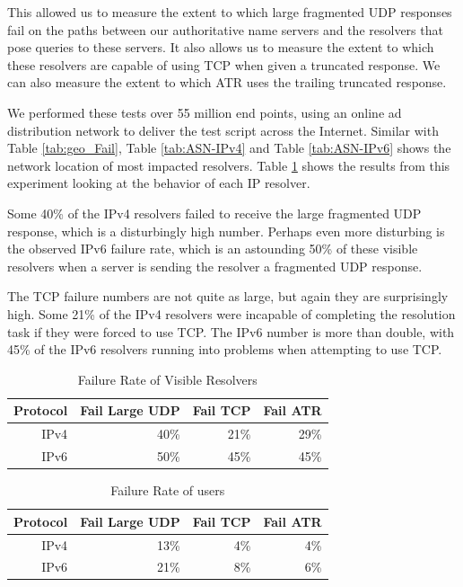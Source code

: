 This allowed us to measure the extent to which large 
fragmented UDP responses fail on the paths between our 
authoritative name servers and the resolvers that pose 
queries to these servers. It also allows us to measure 
the extent to which these resolvers are capable of using 
TCP when given a truncated response. We can also measure 
the extent to which ATR uses the trailing truncated response.

We performed these tests over 55 million end points, using 
an online ad distribution network to deliver the test script 
across the Internet. Similar with Table \ref{tab:geo_Fail}, 
Table \ref{tab:ASN-IPv4} and Table \ref{tab:ASN-IPv6} shows 
the network location of most impacted resolvers. Table 
\ref{tab:fail_resolver} shows the results from this experiment 
looking at the behavior of each IP resolver.

Some 40\% of the IPv4 resolvers failed to receive the large 
fragmented UDP response, which is a disturbingly high number. 
Perhaps even more disturbing is the observed IPv6 failure rate, 
which is an astounding 50\% of these visible resolvers when 
a server is sending the resolver a fragmented UDP response.

The TCP failure numbers are not quite as large, but again 
they are surprisingly high. Some 21\% of the IPv4 resolvers 
were incapable of completing the resolution task if they 
were forced to use TCP. The IPv6 number is more than double, 
with 45\% of the IPv6 resolvers running into problems when 
attempting to use TCP.

\begin{table}[]
   \caption{Failure Rate of Visible Resolvers}
   \centering
\begin{tabular}{@{}rrrl@{}}
\toprule
\multicolumn{1}{c}{\textbf{Protocol}} & \multicolumn{1}{c}{\textbf{Fail Large UDP}} & \multicolumn{1}{c}{\textbf{Fail TCP}} & \textbf{Fail ATR} \\ \midrule
IPv4 & 40\% & 21\% & \multicolumn{1}{r}{29\%} \\
IPv6 & 50\% & 45\% & \multicolumn{1}{r}{45\%} \\ \bottomrule
\end{tabular}
\label{tab:fail_resolver}
\end{table}

\begin{table}[]
\caption{Failure Rate of users}
\begin{tabular}{@{}rrrr@{}}
\toprule
\multicolumn{1}{c}{\textbf{Protocol}} & \multicolumn{1}{c}{\textbf{Fail Large UDP}} & \multicolumn{1}{c}{\textbf{Fail TCP}} & \multicolumn{1}{l}{\textbf{Fail ATR}} \\ \midrule
IPv4 & 13\% & 4\% & 4\% \\
IPv6 & 21\% & 8\% & 6\% \\ \bottomrule
\end{tabular}
\label{tab:fail_user}
\end{table}

